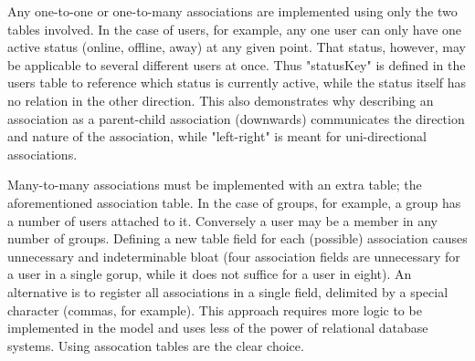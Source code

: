 Any one-to-one or one-to-many associations are implemented using only the two tables involved. In the case of users, for example, any one user can only have one active status (online, offline, away) at any given point. That status, however, may be applicable to several different users at once. Thus "statusKey" is defined in the users table to reference which status is currently active, while the status itself has no relation in the other direction. This also demonstrates why describing an association as a parent-child association (downwards) communicates the direction and nature of the association, while "left-right" is meant for uni-directional associations.

Many-to-many associations must be implemented with an extra table; the aforementioned association table. In the case of groups, for example, a group has a number of users attached to it. Conversely a user may be a member in any number of groups. Defining a new table field for each (possible) association causes unnecessary and indeterminable bloat (four association fields are unnecessary for a user in a single gorup, while it does not suffice for a user in eight). An alternative is to register all associations in a single field, delimited by a special character (commas, for example). This approach requires more logic to be implemented in the model and uses less of the power of relational database systems. Using assocation tables are the clear choice.
